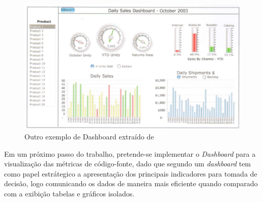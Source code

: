 \begin{figure}[ht!]
\centering
	\includegraphics[keepaspectratio=true,scale=0.8]{figuras/dashboard2.eps}
	\caption{Outro exemplo de Dashboard extraído de 
	}
	\label{dashboard2}
\end{figure}
\FloatBarrier

Em um próximo passo do trabalho, pretende-se implementar o \textit{Dashboard} para a visualização das métricas de código-fonte, dado que segundo  um \textit{dashboard} tem como papel estrátegico a apresentação dos principais indicadores para tomada de decisão, logo comunicando os dados de maneira mais eficiente quando comparado com a exibição tabelas e gráficos isolados.




